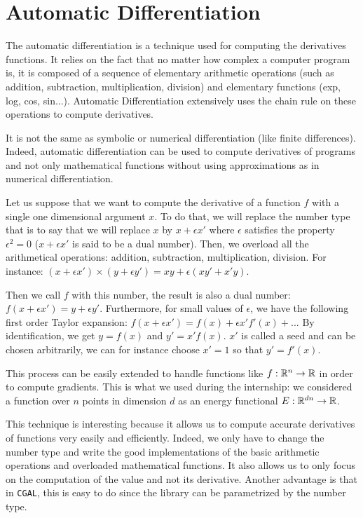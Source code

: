 \chapter{Automatic Differentiation}
\label{appendix:ad}

The automatic differentiation is a technique used for computing the derivatives
functions. It relies on the fact that no matter how complex a computer program
is, it is composed of a sequence of elementary arithmetic operations (such as
addition, subtraction, multiplication, division) and elementary functions (exp,
log, cos, sin...). Automatic Differentiation extensively uses the chain rule on
these operations to compute derivatives.

It is not the same as symbolic or numerical differentiation (like finite
differences). Indeed, automatic differentiation can be used to compute
derivatives of programs and not only mathematical functions without using
approximations as in numerical differentiation.

Let us suppose that we want to compute the derivative of a function $ f $ with a
single one dimensional argument $ x $. To do that, we will replace the number
type that is to say that we will replace $ x $ by $ x + \epsilon x' $ where $
\epsilon $ satisfies the property $ \epsilon^2 = 0 $ ($ x + \epsilon x' $ is
said to be a dual number). Then, we overload all the arithmetical operations:
addition, subtraction, multiplication, division. For instance: $ (x + \epsilon
x') \times (y + \epsilon y') = x y + \epsilon (x y' + x' y) $.

Then we call $ f $ with this number, the result is also a dual number: $ f(x +
\epsilon x') = y + \epsilon y' $.  Furthermore, for small values of $ \epsilon
$, we have the following first order Taylor expansion: $ f(x + \epsilon x') =
f(x) + \epsilon x' f'(x) + ... $ By identification, we get $ y = f(x) $ and $
y' = x' f(x) $. $ x' $ is called a seed and can be chosen arbitrarily, we can
for instance choose $ x ' = 1 $ so that $ y' = f'(x) $.

This process can be easily extended to handle functions like $ f : \mathbb{R}^n
\rightarrow \mathbb{R} $ in order to compute gradients. This is what we used during the
internship: we considered a function over $ n $ points in dimension $ d $ as an
energy functional $ E : \mathbb{R}^{dn} \rightarrow \mathbb{R} $.

This technique is interesting because it allows us to compute accurate
derivatives of functions very easily and efficiently. Indeed, we only have to
change the number type and write the good implementations of the basic
arithmetic operations and overloaded mathematical functions. It also allows us
to only focus on the computation of the value and not its derivative. Another
advantage is that in \texttt{CGAL}, this is easy to do since the library can be
parametrized by the number type.

